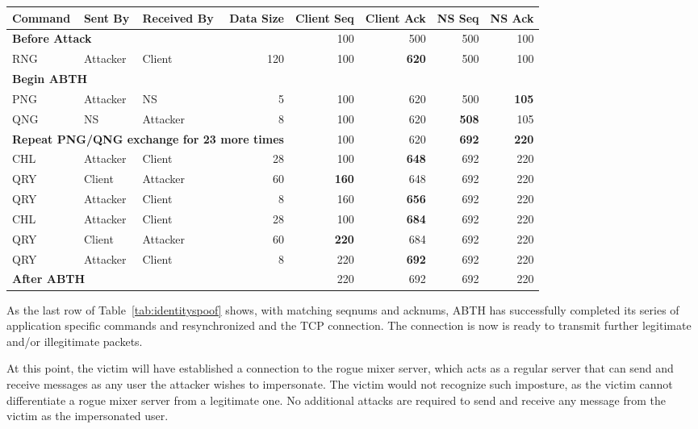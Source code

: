 \documentclass{sig-alternate}
\begin{document}
\begin{table*}[tbp]
	\centering

	\caption{Identity Spoofing Sequence Numbers}
	\label{tab:identityspoof}

	\begin{tabular}{l l l r r r r r}
		\hline
		\hline
		\textbf{Command} & \textbf{Sent By} & \textbf{Received By} & \textbf{Data Size} & \textbf{Client Seq} & \textbf{Client Ack} & \textbf{NS Seq} & \textbf{NS Ack} \\
		\hline
		\multicolumn{4}{l}{\textbf{Before Attack}} & 100 & 500 & 500 & 100 \\
		RNG & Attacker & Client & 120 & 100 & \textbf{620} & 500 & 100 \\
		\multicolumn{8}{l}{\textbf{Begin ABTH}} \\
		PNG & Attacker & NS & 5 & 100 & 620 & 500 & \textbf{105} \\
		QNG & NS & Attacker & 8 & 100 & 620 & \textbf{508} & 105 \\
		\multicolumn{4}{l}{\textbf{Repeat PNG/QNG exchange for 23 more times}} & 100 & 620 & \textbf{692} & \textbf{220} \\
		CHL & Attacker & Client & 28 & 100 & \textbf{648} & 692 & 220 \\
		QRY & Client & Attacker & 60 & \textbf{160} & 648 & 692 & 220 \\
		QRY & Attacker & Client & 8 & 160 & \textbf{656} & 692 & 220 \\
		CHL & Attacker & Client & 28 & 100 & \textbf{684} & 692 & 220 \\
		QRY & Client & Attacker & 60 & \textbf{220} & 684 & 692 & 220 \\
		QRY & Attacker & Client & 8 & 220 & \textbf{692} & 692 & 220 \\
		\hline
		\hline
		\multicolumn{4}{l}{\textbf{After ABTH}} & 220 & 692 & 692 & 220 \\
	\end{tabular}
\end{table*}

As the last row of Table~\ref{tab:identityspoof} shows, with matching seqnums and acknums, ABTH has successfully completed its series of application specific commands and resynchronized and the TCP connection.
The connection is now is ready to transmit further legitimate and/or illegitimate packets.

At this point, the victim will have established a connection to the rogue mixer server, which acts as a regular server that can send and receive messages as any user the attacker wishes to impersonate.
The victim would not recognize such imposture, as the victim cannot differentiate a rogue mixer server from a legitimate one.
No additional attacks are required to send and receive any message from the victim as the impersonated user.
\end{document}
